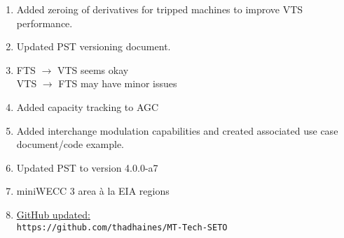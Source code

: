 \documentclass[12pt]{article}
\begin{document}
\begin{multicols}{2}
\begin{comment}
\end{comment}
	\begin{enumerate}	
		\item Added zeroing of derivatives for tripped machines to improve VTS performance.
		
		\item Updated PST versioning document.
		\item FTS $\longrightarrow$ VTS seems okay\\
		 VTS $\longrightarrow$ FTS may have minor issues
		\item Added capacity tracking to AGC
		\item Added interchange modulation capabilities and created associated use case document/code example.
		\item Updated PST to version 4.0.0-a7
		\item miniWECC 3 area \`{a} la EIA regions
		

		\item \href{https://github.com/thadhaines/MT-Tech-SETO}{GitHub updated:}\\
	{\footnotesize \verb|https://github.com/thadhaines/MT-Tech-SETO| }\\
	\end{enumerate}


\end{multicols}
\end{document}
